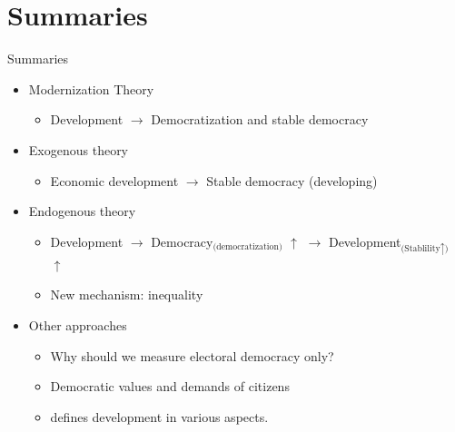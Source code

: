 \documentclass[xcolor=dvipsnames]{beamer}
\begin{document}
\section{Summaries}
\begin{frame}[fragile]{Summaries}
	\begin{itemize}
	  \item Modernization Theory \citep{lipset:1959}
	  \begin{itemize}
	    \item Development $\rightarrow$ Democratization and stable democracy
		\end{itemize}
		\item Exogenous theory \citep{przeworskietal:2000}
		\begin{itemize}
		  \item Economic development $\rightarrow$ Stable democracy (developing)
		\end{itemize}
		\item Endogenous theory \citep{boix:stokes:2003}
		\begin{itemize}
			\item Development $\rightarrow$ Democracy$_\text{(democratization)}$ $\uparrow$ $\rightarrow$ Development$_{\text{(Stablility}\uparrow\text{)}}$ $\uparrow$
			\item New mechanism: inequality
		\end{itemize}
		\item Other approaches \citep{wucherpfennig:Deutsch:2009}
		\begin{itemize}
			\item Why should we measure electoral democracy only?
			\item Democratic values and demands of citizens
			\item \citet{lipset:1959} defines development in various aspects.
		\end{itemize}
	\end{itemize}
\end{frame}
\end{document}
